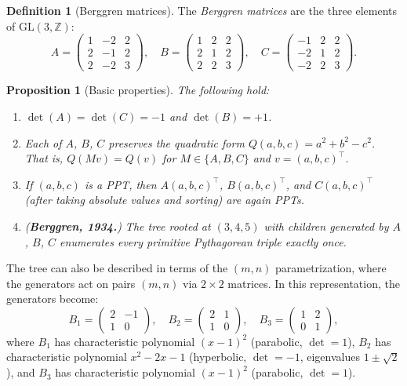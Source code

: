 \documentclass[12pt]{amsart}
\newtheorem{proposition}[theorem]{Proposition}
\theoremstyle{definition}
\newtheorem{definition}[theorem]{Definition}
\theoremstyle{remark}
\begin{document}
\begin{definition}[Berggren matrices]\label{def:berggren}
The \emph{Berggren matrices} are the three elements of $\mathrm{GL}(3,\mathbb{Z})$:
\[
  A = \begin{pmatrix} 1 & -2 & 2 \\ 2 & -1 & 2 \\ 2 & -2 & 3 \end{pmatrix},
  \quad
  B = \begin{pmatrix} 1 & 2 & 2 \\ 2 & 1 & 2 \\ 2 & 2 & 3 \end{pmatrix},
  \quad
  C = \begin{pmatrix} -1 & 2 & 2 \\ -2 & 1 & 2 \\ -2 & 2 & 3 \end{pmatrix}.
\]
\end{definition}

\begin{proposition}[Basic properties]\label{prop:basic}
The following hold:
\begin{enumerate}[label=(\alph*)]
  \item $\det(A)=\det(C)=-1$ and $\det(B)=+1$.
  \item Each of $A$, $B$, $C$ preserves the quadratic form
    $Q(a,b,c)=a^{2}+b^{2}-c^{2}$.  That is,
    $Q(Mv)=Q(v)$ for $M\in\{A,B,C\}$ and $v=(a,b,c)^{\top}$.
  \item If $(a,b,c)$ is a PPT, then $A(a,b,c)^{\top}$, $B(a,b,c)^{\top}$, and
    $C(a,b,c)^{\top}$ (after taking absolute values and sorting) are again PPTs.
  \item (\textbf{Berggren, 1934.}) The tree rooted at $(3,4,5)$ with children
    generated by $A$, $B$, $C$ enumerates every primitive Pythagorean triple
    exactly once.
\end{enumerate}
\end{proposition}

The tree can also be described in terms of the $(m,n)$ parametrization, where
the generators act on pairs $(m,n)$ via $2\times2$ matrices.  In this
representation, the generators become:
\[
  B_1 = \begin{pmatrix} 2 & -1 \\ 1 & 0 \end{pmatrix},
  \quad
  B_2 = \begin{pmatrix} 2 & 1 \\ 1 & 0 \end{pmatrix},
  \quad
  B_3 = \begin{pmatrix} 1 & 2 \\ 0 & 1 \end{pmatrix},
\]
where $B_1$ has characteristic polynomial $(x-1)^{2}$ (parabolic, $\det=1$),
$B_2$ has characteristic polynomial $x^{2}-2x-1$ (hyperbolic, $\det=-1$, eigenvalues
$1\pm\sqrt{2}$), and $B_3$ has characteristic polynomial $(x-1)^{2}$
(parabolic, $\det=1$).
\end{document}
